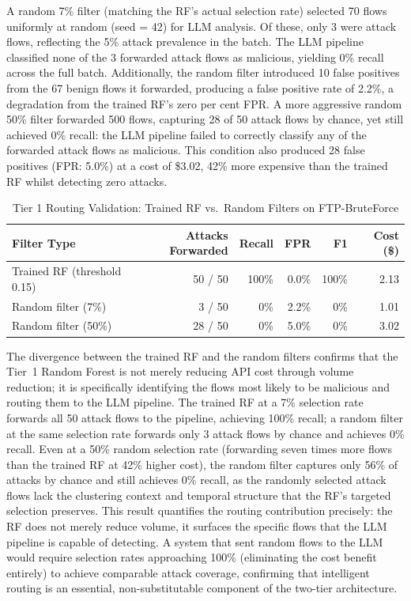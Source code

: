 A random 7\% filter (matching the RF's actual selection rate) selected 70 flows uniformly at random (seed = 42) for LLM analysis. Of these, only 3 were attack flows, reflecting the 5\% attack prevalence in the batch. The LLM pipeline classified none of the 3 forwarded attack flows as malicious, yielding 0\% recall across the full batch. Additionally, the random filter introduced 10 false positives from the 67 benign flows it forwarded, producing a false positive rate of 2.2\%, a degradation from the trained RF's zero per cent FPR. A more aggressive random 50\% filter forwarded 500 flows, capturing 28 of 50 attack flows by chance, yet still achieved 0\% recall: the LLM pipeline failed to correctly classify any of the forwarded attack flows as malicious. This condition also produced 28 false positives (FPR: 5.0\%) at a cost of \$3.02, 42\% more expensive than the trained RF whilst detecting zero attacks.

\begin{table}[H]
\centering
\caption{Tier 1 Routing Validation: Trained RF vs.\ Random Filters on FTP-BruteForce}
\label{tab:routing-control}
\small
\begin{tabular}{l r r r r r}
\toprule
Filter Type & Attacks Forwarded & Recall & FPR & F1 & Cost (\$) \\
\midrule
Trained RF (threshold 0.15) & 50 / 50 & 100\% & 0.0\% & 100\% & 2.13 \\
Random filter (7\%) & 3 / 50 & 0\% & 2.2\% & 0\% & 1.01 \\
Random filter (50\%) & 28 / 50 & 0\% & 5.0\% & 0\% & 3.02 \\
\bottomrule
\end{tabular}
\end{table}

The divergence between the trained RF and the random filters confirms that the Tier~1 Random Forest is not merely reducing API cost through volume reduction; it is specifically identifying the flows most likely to be malicious and routing them to the LLM pipeline. The trained RF at a 7\% selection rate forwards all 50 attack flows to the pipeline, achieving 100\% recall; a random filter at the same selection rate forwards only 3 attack flows by chance and achieves 0\% recall. Even at a 50\% random selection rate (forwarding seven times more flows than the trained RF at 42\% higher cost), the random filter captures only 56\% of attacks by chance and still achieves 0\% recall, as the randomly selected attack flows lack the clustering context and temporal structure that the RF's targeted selection preserves. This result quantifies the routing contribution precisely: the RF does not merely reduce volume, it surfaces the specific flows that the LLM pipeline is capable of detecting. A system that sent random flows to the LLM would require selection rates approaching 100\% (eliminating the cost benefit entirely) to achieve comparable attack coverage, confirming that intelligent routing is an essential, non-substitutable component of the two-tier architecture.

